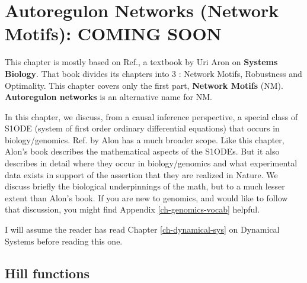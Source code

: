 \chapter{Autoregulon Networks (Network Motifs): COMING SOON}
\label{ch-autoregulons}


This chapter is mostly based on Ref.\cite{alon-book},
a textbook by Uri Aron 
on {\bf Systems Biology}. That book divides its chapters into 3 : Network Motifs, Robustness and Optimality. This chapter covers only the first part, {\bf Network Motifs} (NM). {\bf Autoregulon networks}
is an alternative name for NM. 

In this chapter, we discuss,
from a causal inference perspective, a  special 
class of 
S1ODE (system of first order ordinary differential equations) that occurs in biology/genomics.
 Ref.\cite{alon-book} by Alon
 has a much broader scope. Like this chapter, 
Alon's book describes the mathematical aspects of the
 S1ODEs. But it 
also describes  in detail where they occur in biology/genomics and what experimental data exists in support
of the assertion that they are 
realized in Nature. We discuss briefly the biological
underpinnings of the math, but 
to a much lesser extent than Alon's book.
If you are new to genomics, and would like to follow that discussion, you might find Appendix \ref{ch-genomics-vocab} helpful.

I will assume
the reader has read 
 Chapter \ref{ch-dynamical-sys}
on Dynamical Systems before reading this one.



\section{Hill functions}

